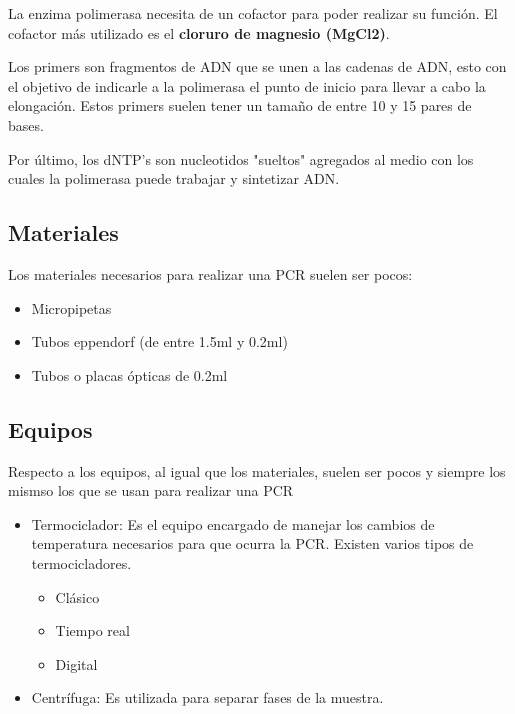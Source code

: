 La enzima polimerasa necesita de un cofactor para poder realizar su función. El cofactor más utilizado es el \textbf{cloruro de magnesio (MgCl2)}.

Los primers son fragmentos de ADN que se unen a las cadenas de ADN, esto con el objetivo de indicarle a la polimerasa el punto de inicio para llevar a cabo la elongación.
Estos primers suelen tener un tamaño de entre 10 y 15 pares de bases.

Por último, los dNTP's son nucleotidos "sueltos" agregados al medio con los cuales la polimerasa puede trabajar y sintetizar ADN.

\subsection{Materiales}

Los materiales necesarios para realizar una PCR suelen ser pocos:

\begin{itemize}
    \item Micropipetas
    \item Tubos eppendorf (de entre 1.5ml y 0.2ml)
    \item Tubos o placas ópticas de 0.2ml
\end{itemize}

\subsection{Equipos}

Respecto a los equipos, al igual que los materiales, suelen ser pocos y siempre los mismso los que se usan para realizar una PCR

\begin{itemize}
    \item Termociclador: Es el equipo encargado de manejar los cambios de temperatura necesarios para que ocurra la PCR. Existen varios tipos de termocicladores.
        \begin{itemize}
            \item Clásico
            \item Tiempo real
            \item Digital
        \end{itemize}
    
    \item Centrífuga: Es utilizada para separar fases de la muestra.  
\end{itemize}